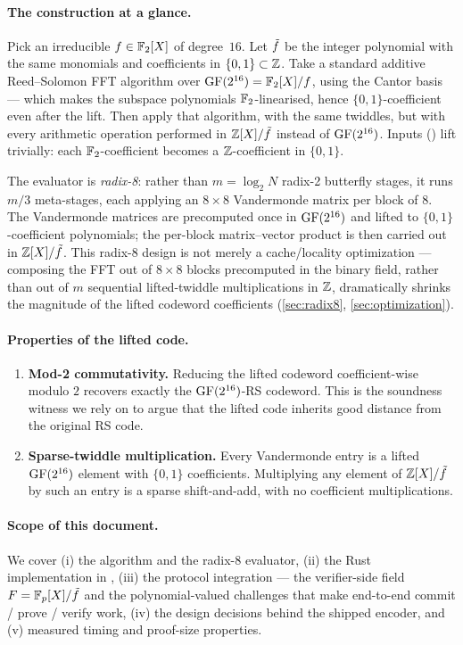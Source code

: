 \paragraph{The construction at a glance.}
Pick an irreducible $f \in \mathbb{F}_2[X]$ of degree~$16$. Let $\tilde f$ be
the integer polynomial with the same monomials and coefficients in
$\{0,1\} \subset \mathbb{Z}$. Take a standard additive Reed--Solomon FFT
algorithm over $\operatorname{GF}(2^{16}) = \mathbb{F}_2[X]/f$, using the Cantor basis ---
which makes the subspace polynomials $\mathbb{F}_2$-linearised, hence
$\{0,1\}$-coefficient even after the lift. Then apply that algorithm,
with the same twiddles, but with every arithmetic operation performed
in $\mathbb{Z}[X]/\tilde f$ instead of $\operatorname{GF}(2^{16})$. Inputs ()
lift trivially: each $\mathbb{F}_2$-coefficient becomes a $\mathbb{Z}$-coefficient in
$\{0,1\}$.

The evaluator is \emph{radix-8}: rather than $m = \log_2 N$ radix-2
butterfly stages, it runs $m/3$ meta-stages, each applying an
$8 \times 8$ Vandermonde matrix per block of $8$. The Vandermonde
matrices are precomputed once in $\operatorname{GF}(2^{16})$ and lifted to
$\{0,1\}$-coefficient polynomials; the per-block matrix--vector
product is then carried out in $\mathbb{Z}[X]/\tilde f$. This radix-8 design is
not merely a cache/locality optimization --- composing the FFT out of
$8 \times 8$ blocks precomputed in the binary field, rather than out
of $m$ sequential lifted-twiddle multiplications in $\mathbb{Z}$, dramatically
shrinks the magnitude of the lifted codeword coefficients
(\autoref{sec:radix8}, \autoref{sec:optimization}).

\paragraph{Properties of the lifted code.}
\begin{enumerate}
  \item \textbf{Mod-2 commutativity.} Reducing the lifted codeword
    coefficient-wise modulo $2$ recovers exactly the
    $\operatorname{GF}(2^{16})$-RS codeword. This is the soundness witness we
    rely on to argue that the lifted code inherits good distance
    from the original RS code.
  \item \textbf{Sparse-twiddle multiplication.} Every Vandermonde
    entry is a lifted $\operatorname{GF}(2^{16})$ element with $\{0,1\}$
    coefficients. Multiplying any element of $\mathbb{Z}[X]/\tilde f$ by such an
    entry is a sparse shift-and-add, with no coefficient
    multiplications.
\end{enumerate}

\paragraph{Scope of this document.}
We cover (i) the algorithm and the radix-8 evaluator, (ii) the Rust
implementation in
, (iii) the
protocol integration --- the verifier-side field $F = \mathbb{F}_p[X]/\tilde f$
and the polynomial-valued challenges that make end-to-end
commit / prove / verify work, (iv) the design decisions behind the
shipped encoder, and (v) measured timing and proof-size properties.
